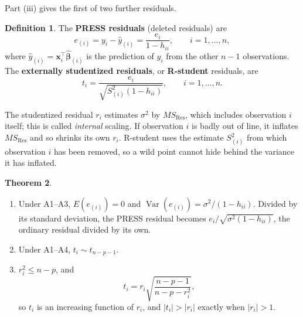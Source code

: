 \documentclass[11pt,a4paper]{article}
\numberwithin{equation}{section}
\theoremstyle{definition}
\newtheorem{thm}{Theorem}[subsection]
\newtheorem{defn}[thm]{Definition}
\begin{document}
Part (iii) gives the first of two further residuals.

\begin{defn}
The \textbf{PRESS residuals} (deleted residuals) are
\[
e_{(i)} = y_i - \hat y_{(i)} = \frac{e_i}{1 - h_{ii}} , \qquad i = 1, \dots, n ,
\]
where $\hat y_{(i)} = \mathbf{x}_i^\top\hat{\boldsymbol\beta}_{(i)}$ is the prediction of
$y_i$ from the other $n - 1$ observations. The \textbf{externally studentized residuals},
or \textbf{R-student} residuals, are
\[
t_i = \frac{e_i}{\sqrt{S^2_{(i)}(1 - h_{ii})}} , \qquad i = 1, \dots, n .
\]
\end{defn}

The studentized residual $r_i$ estimates $\sigma^2$ by $MS_{\mathrm{Res}}$, which includes
observation $i$ itself; this is called \emph{internal} scaling. If observation $i$ is
badly out of line, it inflates $MS_{\mathrm{Res}}$ and so shrinks its own $r_i$. R-student
uses the estimate $S^2_{(i)}$ from which observation $i$ has been removed, so a wild point
cannot hide behind the variance it has inflated.

\begin{thm}\label{thm:rstudent}
\begin{enumerate}[label=(\roman*)]
\item Under A1--A3, $E(e_{(i)}) = 0$ and $\operatorname{Var}(e_{(i)}) = \sigma^2/(1 - h_{ii})$.
Divided by its standard deviation, the PRESS residual becomes
$e_i\big/\sqrt{\sigma^2(1 - h_{ii})}$, the ordinary residual divided by its own.
\item Under A1--A4, $t_i \sim t_{n - p - 1}$.
\item $r_i^2 \le n - p$, and
\[
t_i = r_i\sqrt{\frac{n - p - 1}{n - p - r_i^2}} ,
\]
so $t_i$ is an increasing function of $r_i$, and $|t_i| > |r_i|$ exactly when $|r_i| > 1$.
\end{enumerate}
\end{thm}
\end{document}
